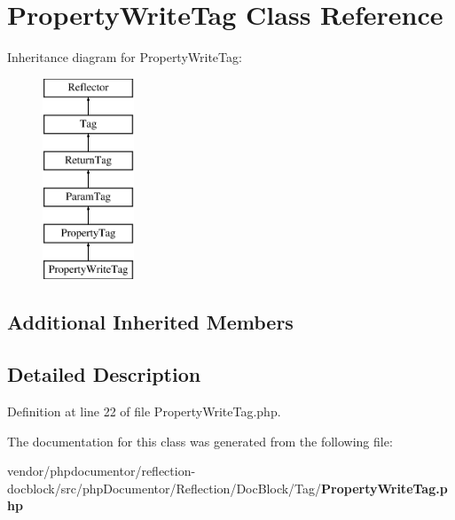 \section{Property\+Write\+Tag Class Reference}
\label{classphp_documentor_1_1_reflection_1_1_doc_block_1_1_tag_1_1_property_write_tag}
Inheritance diagram for Property\+Write\+Tag\+:\begin{figure}[H]
\begin{center}
\leavevmode
\includegraphics[height=6.000000cm]{classphp_documentor_1_1_reflection_1_1_doc_block_1_1_tag_1_1_property_write_tag}
\end{center}
\end{figure}
\subsection*{Additional Inherited Members}


\subsection{Detailed Description}


Definition at line 22 of file Property\+Write\+Tag.\+php.



The documentation for this class was generated from the following file\+:\begin{DoxyCompactItemize}
\item 
vendor/phpdocumentor/reflection-\/docblock/src/php\+Documentor/\+Reflection/\+Doc\+Block/\+Tag/{\bf Property\+Write\+Tag.\+php}\end{DoxyCompactItemize}
